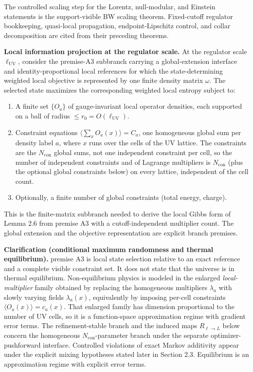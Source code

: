 The controlled scaling step for the Lorentz, null-modular, and Einstein statements is the
support-visible BW scaling theorem. Fixed-cutoff regulator bookkeeping, quasi-local propagation,
endpoint-Lipschitz control, and collar decomposition are cited from their preceding theorems.

\textbf{Local information projection at the regulator scale.} At the regulator scale \(\ell_{\mathrm{UV}}\), consider the premise-A3 subbranch carrying a global-extension interface and identity-proportional local references for which the state-determining weighted local objective is represented by one finite density matrix \(\omega\). The selected state maximizes the corresponding weighted local entropy subject to:

\begin{enumerate}
\def\labelenumi{\arabic{enumi}.}
\tightlist
\item
  A finite set \(\{O_a\}\) of gauge-invariant local operator densities, each supported on a ball of radius \(\le r_0 = O(\ell_{\mathrm{UV}})\).
\item
  Constraint equations \(\bigl\langle \sum_x O_a(x) \bigr\rangle = C_a\), one homogeneous global sum per density label \(a\), where \(x\) runs over the cells of the UV lattice. The constraints are the \(N_{\mathrm{con}}\) global sums, not one independent constraint per cell, so the number of independent constraints and of Lagrange multipliers is \(N_{\mathrm{con}}\) (plus the optional global constraints below) on every lattice, independent of the cell count.
\item
  Optionally, a finite number of global constraints (total energy, charge).
\end{enumerate}

This is the finite-matrix subbranch needed to derive the local Gibbs form of Lemma 2.6 from premise A3 with a cutoff-independent multiplier count. The global extension and the objective representation are explicit branch premises.

\textbf{Clarification (conditional maximum randomness and thermal equilibrium).} premise A3 is local state selection relative to an exact reference and a complete visible constraint set. It does not state that the universe is in thermal equilibrium. Non-equilibrium physics is modeled in the enlarged \emph{local-multiplier} family obtained by replacing the homogeneous multipliers \(\lambda_a\) with slowly varying fields \(\lambda_a(x)\), equivalently by imposing per-cell constraints \(\langle O_a(x)\rangle = c_a(x)\). That enlarged family has dimension proportional to the number of UV cells, so it is a function-space approximation regime with gradient error terms. The refinement-stable branch and the induced maps \(R_{\ell\to L}\) below concern the homogeneous \(N_{\mathrm{con}}\)-parameter branch under the separate optimizer-pushforward interface. Controlled violations of exact Markov additivity appear under the explicit mixing hypotheses stated later in Section 2.3. Equilibrium is an approximation regime with explicit error terms.

